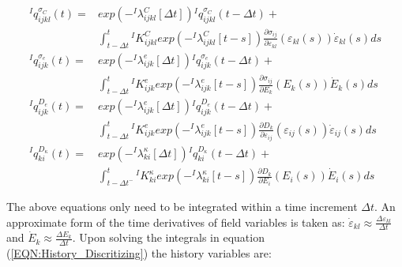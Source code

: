 \begin{equation}
\begin{aligned}
{}^{I}q_{ijkl}^{\sigma_C}(t)= 
&exp(-{}^{I}\lambda_{ijkl}^{C}[\Delta t]){}^{I}q_{ijkl}^{\sigma_C}(t-\Delta t)+ \\
&\int_{t-\Delta t}^{t}  
{}^{I}K_{ijkl}^{C}
exp(-{}^{I}\lambda_{ijkl}^{C}[t-s])\frac{\partial \sigma_{ij}}{\partial \varepsilon_{kl}} (\varepsilon_{kl}(s)) \dot{\varepsilon}_{kl}(s)ds \\
{}^{I}q_{ijk}^{\sigma_e}(t)=
&exp(-{}^{I}\lambda_{ijk}^{e}[\Delta t]) {}^{I}q_{ijk}^{\sigma_e}(t-\Delta t)+ \\
&\int_{t-\Delta t}^{t}  
{}^{I}K_{ijk}^{e} exp(-{}^{I}\lambda_{ijk}^{e}[t-s]) \frac{\partial \sigma_{ij}}{\partial E_{k}} (E_{k} (s)) \dot{E}_{k} (s)ds \\
{}^{I}q_{ijk}^{D_e}(t)=
&exp(-{}^{I}\lambda_{ijk}^{e}[\Delta t]){}^{I}q_{ijk}^{D_e}(t-\Delta t)+\\
&\int_{t-\Delta t}^t 
{}^{I}K_{ijk}^{e} exp(-{}^{I}\lambda_{ijk}^{e}[t-s]) \frac{\partial D_{k}}{\partial \varepsilon_{ij}}(\varepsilon_{ij}(s)) \dot{\varepsilon}_{ij}(s)ds\\
{}^{I}q_{ki}^{D_{\kappa}}(t)=
&exp(-{}^{I}\lambda_{ki}^{\kappa}[\Delta t]){}^{I}q_{ki}^{D_{\kappa}}(t-\Delta t)+\\
&\int_{t-\Delta t^-}^t  
{}^{I}K_{ki}^{\kappa}
exp(-{}^{I}\lambda_{ki}^{\kappa}[t-s]) \frac{\partial D_{k}}{\partial E_{i}} (E_{i} (s)) \dot{E}_{i} (s)ds
\end{aligned}
\label{EQN:History_Discritizing}
\end{equation}

The above equations only need to be integrated within a time increment $\Delta t$. 
An approximate form of the time derivatives of field variables is taken as: $\dot{\varepsilon}_{kl} \approx \frac{\Delta \varepsilon_{kl}}{\Delta t}$ and $\dot{E}_{k}\approx \frac{\Delta E_k}{\Delta t}$. 
Upon solving the integrals in equation (\ref{EQN:History_Discritizing}) the history variables are:

